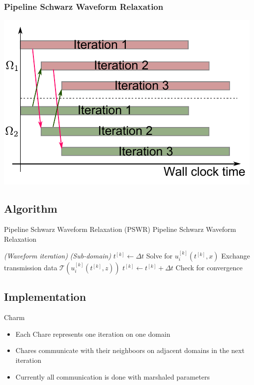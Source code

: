 \documentclass[]{beamer}
\begin{document}
\begin{frame}
  \frametitle{Pipeline Schwarz Waveform Relaxation}
  \centering
  \includegraphics[height=0.7\textheight]{figures/pswr}
\end{frame}


\subsection{Algorithm}

\begin{frame}{Pipeline Schwarz Waveform Relaxation (PSWR)}
  {Pipeline Schwarz Waveform Relaxation}

    \begin{algorithmic}
    \textit{ (Waveform iteration)}
       \textit{ (Sub-domain)}
        \State $t^{[k]} \gets \Delta t$
            \State Solve for $u_i^{[k]}(t^{[k]},x)$
            \State Exchange transmission data $\mathcal{T}(u_i^{[k]}(t^{[k]}, z))$
            \State $t^{[k]} \gets t^{[k]} + \Delta t$
          \EndRedIf
        \EndWhile
      \EndParFor
      \State Check for convergence          
    \EndRedParFor
  \end{algorithmic}

\end{frame}


\subsection{Implementation}

\begin{frame}{Charm}

  \begin{itemize}
  \item Each Chare represents one iteration on one domain
  \item Chares communicate with their neighboors on adjacent domains
    in the next iteration
  \item Currently all communication is done with marshaled parameters
  \end{itemize}

\end{frame}
\end{document}
